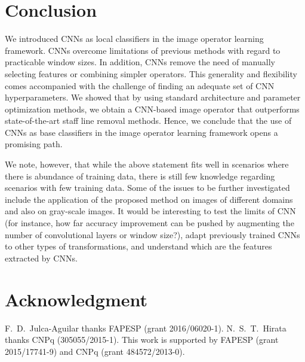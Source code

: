 \documentclass[conference]{IEEEtran}
\begin{document}
\section{Conclusion}
\label{sec:conclusion}

We introduced CNNs as local classifiers in the image operator learning
framework. CNNs overcome limitations of previous methods with regard
to practicable window sizes. In addition, CNNs remove the need of
manually selecting features or combining simpler operators. This
generality and flexibility comes accompanied with the challenge of
finding an adequate set of CNN hyperparameters. We showed that by
using standard architecture and parameter optimization methods, we
obtain a CNN-based image operator that outperforms state-of-the-art
staff line removal methods. Hence, we conclude that the use of CNNs as
base classifiers in the image operator learning framework opens a
promising path.

We note, however, that while the above statement fits well in
scenarios where there is abundance of training data, there is still
few knowledge regarding scenarios with few training data. Some of the
issues to be further investigated include the application of the
proposed method on images of different domains and also on gray-scale
images. It would be interesting to test the limits of CNN (for
instance, how far accuracy improvement can be pushed by augmenting the
number of convolutional layers or window size?), adapt previously
trained CNNs to other types of transformations, and understand which
are the features extracted by CNNs.

\section*{Acknowledgment}
F.~D.~Julca-Aguilar thanks FAPESP (grant
2016/06020-1). N.~S.~T.~Hirata thanks CNPq (305055/2015-1).
This work is supported by FAPESP (grant 2015/17741-9) and CNPq (grant
484572/2013-0).








\end{document}
